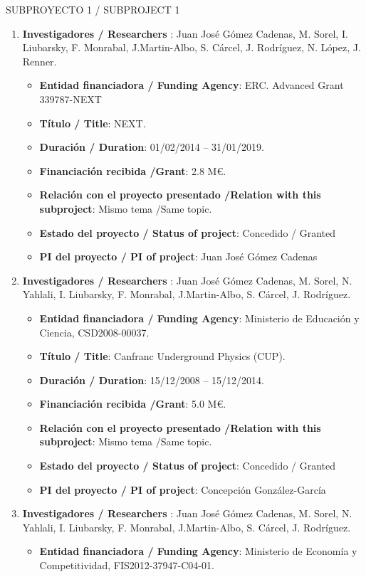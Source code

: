 {\sc SUBPROYECTO 1 / SUBPROJECT 1}

\begin{enumerate}
\item {\bf Investigadores / Researchers }: Juan José Gómez Cadenas, M. Sorel, I. Liubarsky, F. Monrabal, J.Martin-Albo, S. Cárcel, J. Rodríguez, N. López, J. Renner.
\begin{itemize}
\item {\bf Entidad financiadora / Funding Agency}: ERC. Advanced Grant 339787-NEXT 
\item {\bf Título / Title}:  NEXT.
\item {\bf Duración / Duration}: 01/02/2014 -- 31/01/2019. 
\item {\bf Financiación recibida /Grant}: 2.8 M\euro. 
\item {\bf Relación con el proyecto presentado /Relation with this subproject}: Mismo tema /Same topic. 
\item {\bf Estado del proyecto / Status of project}: Concedido / Granted
\item {\bf PI del proyecto / PI of project}: Juan José Gómez Cadenas
\end{itemize}
\item {\bf Investigadores / Researchers }: Juan José Gómez Cadenas, M. Sorel, N. Yahlali, I. Liubarsky, F. Monrabal, J.Martin-Albo, S. Cárcel, J. Rodríguez.
\begin{itemize}
\item {\bf Entidad financiadora / Funding Agency}: Ministerio de Educaci\'on y Ciencia, CSD2008-00037.
\item {\bf Título / Title}:  Canfranc Underground Physics (CUP).
\item {\bf Duración / Duration}: 15/12/2008 -- 15/12/2014. 
\item {\bf Financiación recibida /Grant}: 5.0 M\euro. 
\item {\bf Relación con el proyecto presentado /Relation with this subproject}: Mismo tema /Same topic. 
\item {\bf Estado del proyecto / Status of project}: Concedido / Granted
\item {\bf PI del proyecto / PI of project}: Concepción González-García 
\end{itemize}
\item {\bf Investigadores / Researchers }: Juan José Gómez Cadenas, M. Sorel, N. Yahlali, I. Liubarsky, F. Monrabal, J.Martin-Albo, S. Cárcel, J. Rodríguez.
\begin{itemize}
\item {\bf Entidad financiadora / Funding Agency}:  Ministerio de Econom\'ia y Competitividad, FIS2012-37947-C04-01.

\end{itemize}
\end{enumerate}
